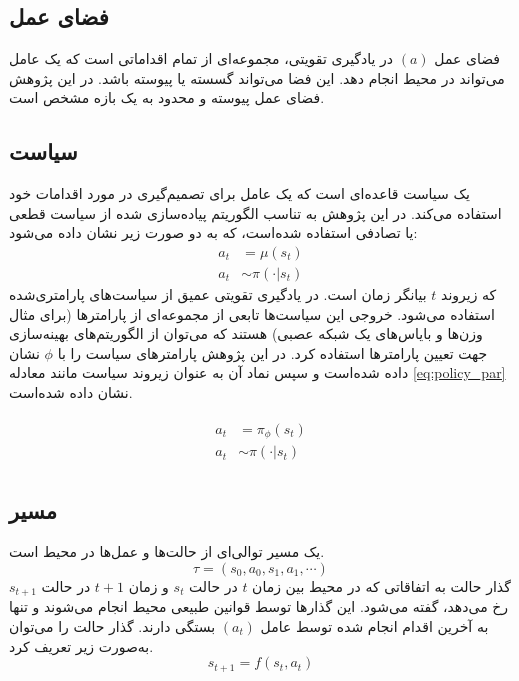 \subsection{فضای عمل}
فضای عمل \((a)\) در یادگیری تقویتی، مجموعه‌ای از تمام اقداماتی است که یک عامل می‌تواند در محیط انجام دهد. این فضا می‌تواند گسسته یا پیوسته باشد. در این پژوهش فضای عمل پیوسته و محدود به یک بازه مشخص است.
\subsection{سیاست}
یک سیاست
  قاعده‌ای است که یک عامل برای تصمیم‌گیری در مورد اقدامات خود استفاده می‌کند. در این پژوهش به تناسب الگوریتم پیاده‌سازی شده از سیاست قطعی
 یا تصادفی
  استفاده شده‌است، که به دو صورت زیر  نشان داده می‌شود:
  \begin{align}
  	a_t &= \mu(s_t)\\
  	a_t & \sim \pi(\cdot | s_t)
  \end{align}
  که زیروند \(t\)
   بیانگر زمان است.
  در یادگیری تقویتی عمیق از سیاست‌های پارامتری‌شده استفاده می‌شود. خروجی‌ این سیاست‌ها تابعی از مجموعه‌ای از پارامترها (برای مثال وزن‌ها و بایاس‌های یک شبکه عصبی) هستند که می‌توان از الگوریتم‌های بهینه‌سازی جهت تعیین پارامترها استفاده کرد.
  در این پژوهش پارامترهای سیاست را با \( \phi\) نشان داده شده‌است و سپس نماد آن به عنوان زیروند  سیاست مانند معادله \eqref{eq:policy_par} نشان داده شده‌است.
  
\begin{align}
	 \begin{split} 	 
 	a_t &= \pi_{\phi}(s_t) \\
 		a_t & \sim \pi(\cdot | s_t)
 	 \end{split}
 	 	\label{eq:policy_par}
\end{align}
\subsection{مسیر}
یک مسیر
 توالی‌ای از حالت‌ها و عمل‌ها در محیط است.
 \begin{equation}
		 \tau = (s_0, a_0, s_1, a_1, \cdots)
 \end{equation}
  گذار حالت
   به اتفاقاتی که در محیط بین 
   زمان \(t\)
   در حالت \(s_t\)
   و
      زمان
       \(t+1\)
   در حالت
    \(s_{t+1}\)
   رخ می‌دهد، گفته می‌شود. این گذارها توسط قوانین طبیعی محیط انجام می‌شوند و تنها به آخرین اقدام انجام شده توسط عامل \((a_t)\) بستگی دارند. گذار حالت را می‌توان به‌صورت زیر تعریف کرد.
   \begin{equation}
   	s_{t+1} = f(s_t, a_t)
   \end{equation}
  
